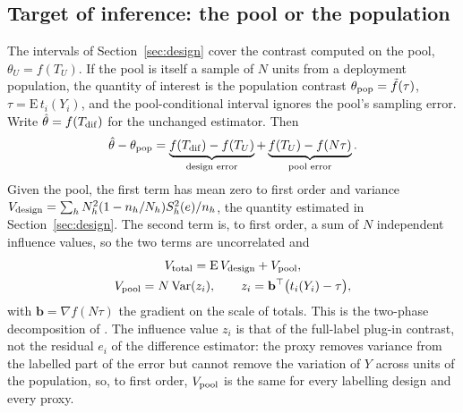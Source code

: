 \subsection{Target of inference: the pool or the population}\label{sec:population}

The intervals of Section~\ref{sec:design} cover the contrast computed on the pool, $\theta_U=f(T_U)$. If the pool is itself a sample of $N$ units from a deployment population, the quantity of interest is the population contrast $\theta_{\rm pop}=\tilde f(\tau)$, $\tau=\mathrm E\,t_i(Y_i)$, and the pool-conditional interval ignores the pool's sampling error. Write $\hat\theta=f(T_{\rm dif})$ for the unchanged estimator. Then
\[
\hat\theta-\theta_{\rm pop}=\underbrace{f(T_{\rm dif})-f(T_U)}_{\text{design error}}+\underbrace{f(T_U)-f(N\tau)}_{\text{pool error}} .
\]
Given the pool, the first term has mean zero to first order and variance $V_{\rm design}=\sum_h N_h^2(1-n_h/N_h)S_h^2(e)/n_h$, the quantity estimated in Section~\ref{sec:design}. The second term is, to first order, a sum of $N$ independent influence values, so the two terms are uncorrelated and
\begin{equation}\label{eq:pop-variance}
\begin{gathered}
V_{\rm total}=\mathrm E\,V_{\rm design}+V_{\rm pool},\\
V_{\rm pool}=N\,\mathrm{Var}(z_i),\qquad z_i=\mathbf b^{\top}\bigl(t_i(Y_i)-\tau\bigr),
\end{gathered}
\end{equation}
with $\mathbf b=\nabla f(N\tau)$ the gradient on the scale of totals. This is the two-phase decomposition of \citet{sarndal1987}. The influence value $z_i$ is that of the full-label plug-in contrast, not the residual $e_i$ of the difference estimator: the proxy removes variance from the labelled part of the error but cannot remove the variation of $Y$ across units of the population, so, to first order, $V_{\rm pool}$ is the same for every labelling design and every proxy.

